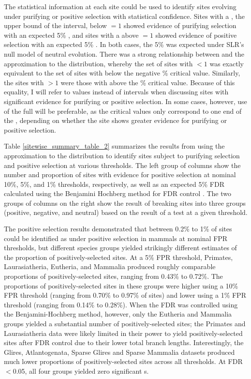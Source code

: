 The statistical information at each site could be used to identify
sites evolving under purifying or positive selection with statistical
confidence. Sites with a \ciup, the upper bound of the \ci interval,
below \omg$=1$ showed evidence of purifying selection with an expected
5\% \fpr, and sites with a \cidown above \omg$=1$ showed evidence of
positive selection with an expected 5\% \fpr. In both cases, the 5\%
\fpr was expected under SLR's null model of neutral evolution. There
was a strong relationship between \ciup and the \chisq approximation
to the \slrt distribution, whereby the set of sites with \ciup$<1$ was
exactly equivalent to the set of sites with \slrt below the negative
\% critical value. Similarly, the sites with \cidown$>1$ were
those with \slrt above the \% critical value. Because of this
equality, I will refer to \slrt values instead of \ci intervals when
discussing sites with significant evidence for purifying or positive
selection. In some cases, however, use of the full \ci will be
preferable, as the \slrt critical values only correspond to one end of
the \ci, depending on whether the site shows greater evidence for
purifying or positive selection.

Table \ref{sitewise_summary_table_2} summarizes the results from using
the \chisq approximation to the \slrt distribution to identify sites
subject to purifying selection and positive selection at various \fpr
thresholds. The left group of columns show the number and proportion
of sites with evidence for positive selection at nominal 10\%, 5\%,
and 1\% \fpr thresholds, respectively, as well as an expected 5\% FDR
calculated using the Benjamini Hochberg method for FDR control
\citep{Benjamini1995}. The two groups of columns on the right show
the result of breaking sites into three groups (positive, negative,
and neutral) based on the result of a \chisq test at a given \fpr
threshold.

The positive selection results demonstrated that between 0.2\% to 1\%
of sites could be identified as under positive selection in mammals at
nominal FPR thresholds, but different species groups yielded
strikingly different estimates of the proportion of
positively-selected sites. At a 5\% FPR threshold, Primates,
Laurasiatheria, Eutheria, and Mammalia produced roughly comparable
proportions of positively-selected sites, ranging from 0.43\% to
0.72\%. The proportions of positively-selected sites in these groups
were higher using a 10\% FPR threshold (ranging from 0.70\% to 0.97\%
of sites) and lower using a 1\% FPR threshold (ranging from 0.14\% to
0.28\%). When the FDR was controlled using the Benjamini-Hochberg
method, however, only the Eutheria and Mammalia groups yielded a
substantial number of positively-selected sites; the Primates and
Laurasiatheria data were likely limited in their power to yield
positively-selected sites after FDR control due to their lower total
branch lengths. Interestingly, the Glires, Atlantogenata, Sparse
Glires and Sparse Mammalia datasets produced much lower proportions of
positively-selected sites across all \fpr thresholds. At FDR$<$0.05,
all four groups yielded zero significant \psc{}s.

